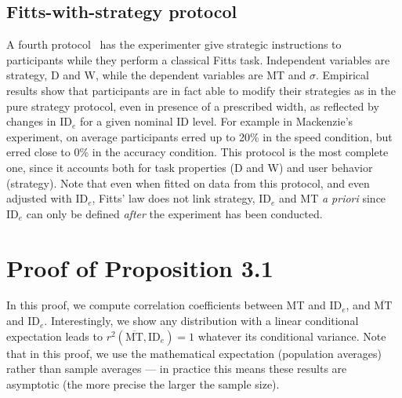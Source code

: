 \documentclass[acmlarge, manuscript,review]{acmart}
\newcommand{\mmt}{\ensuremath{\overline{\mt}}\xspace}
\newcommand{\mt}{\ensuremath{{\text{MT}}}\xspace}
\newcommand{\ide}{\ensuremath{{\text{ID}_e}}\xspace}
\begin{document}
\subsection{Fitts-with-strategy protocol\label{background:protocols:full_protocol}}
A fourth protocol~\cite{mackenzie2008, yamanaka2023,batmaz2022} has the experimenter give strategic instructions to participants while they perform a classical Fitts task. Independent variables are strategy, D and W, while the dependent variables are MT and $\sigma$. Empirical results show that participants are in fact able to modify their strategies as in the pure strategy protocol, even in presence of a prescribed width, as reflected \eg by changes in \ide for a given nominal ID level.
For example in Mackenzie's~\cite{mackenzie2008} experiment, on average participants erred up to 20\% in the speed condition, but erred close to 0\% in the accuracy condition. This protocol is the most complete one, since it accounts both for task properties (D and W) and user behavior (strategy). 
Note that even when fitted on data from this protocol, and even adjusted with \ide, Fitts' law does not link strategy, \ide and MT \textit{a priori} since \ide can only be defined \textit{after} the experiment has been conducted.



\section{Proof of Proposition 3.1 \label{app:proofs}}
In this proof, we compute correlation coefficients between MT and \ide, and \mmt and \ide. Interestingly, we show any distribution with a linear conditional expectation leads to $r^2(\mmt, \ide) = 1$ whatever its conditional variance. Note that in this proof, we use the mathematical expectation (\ie population averages) rather than sample averages --- in practice this means these results are asymptotic (the more precise the larger the sample size).
\end{document}
